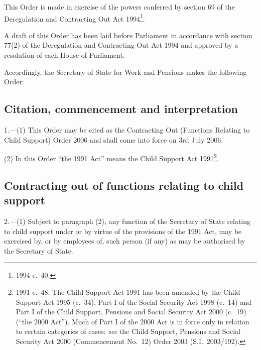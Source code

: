 \documentclass[12pt,a4paper]{article}
\title{\regstitle}
\author{S.I.\ 2006 No.\ 1692}
\date{Made
27th June 2006\\
Coming into force
3rd July 2006
}
\begin{document}
\maketitle

\noindent
This Order is made in exercise of the powers conferred by section 69 of the Deregulation and Contracting Out Act 1994\footnote{1994 c.\ 40.}.

A draft of this Order has been laid before Parliament in accordance with section 77(2) of the Deregulation and Contracting Out Act 1994 and approved by a resolution of each House of Parliament.

Accordingly, the Secretary of State for Work and Pensions makes the following Order: 

{\sloppy

\tableofcontents

}

\bigskip

\setcounter{secnumdepth}{-2}

\subsection[1. Citation, commencement and interpretation]{Citation, commencement and interpretation}

1.---(1)  This Order may be cited as the Contracting Out (Functions Relating to Child Support) Order 2006 and shall come into force on 3rd July 2006.

(2) In this Order “the 1991 Act” means the Child Support Act 1991\footnote{1991 c.\ 48. The Child Support Act 1991 has been amended by the Child Support Act 1995 (c.\ 34), Part I of the Social Security Act 1998 (c.\ 14) and Part I of the Child Support, Pensions and Social Security Act 2000 (c.\ 19) (“the 2000 Act”). Much of Part I of the 2000 Act is in force only in relation to certain categories of cases: \emph{see} the Child Support, Pensions and Social Security Act 2000 (Commencement No.\ 12) Order 2003 (S.I.\ 2003/192).}.

\subsection[2. Contracting out of functions relating to child support]{Contracting out of functions relating to child support}

2.---(1)  Subject to paragraph (2), any function of the Secretary of State relating to child support under or by virtue of the provisions of the 1991 Act, may be exercised by, or by employees of, such person (if any) as may be authorised by the Secretary of State.
\end{document}
